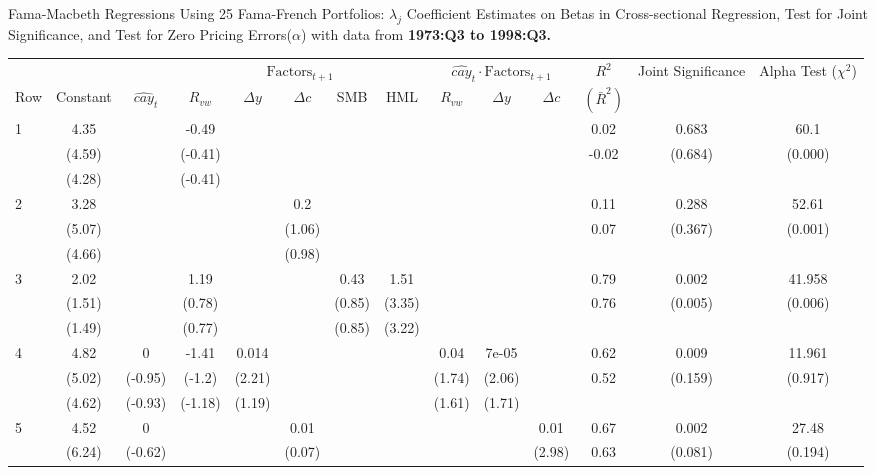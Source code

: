 \documentclass[12pt]{article}
\begin{document}
\begin{landscape}
\begin{threeparttable}[htbp]
\centering
\label{table:old}
\caption{  Fama-Macbeth Regressions Using 25 Fama-French Portfolios: $\lambda_j$ Coefficient Estimates on Betas in Cross-sectional Regression,  Test for Joint Significance, and Test for Zero Pricing Errors($\alpha$) with data from \textbf{1973:Q3 to 1998:Q3.} } 
\begin{tabular}{lccccccccccccc}
  \toprule
  \midrule
   & &  & \multicolumn{5}{c}{$\text{Factors}_{t+1}$}  & \multicolumn{3}{c}{$\widehat{cay}_t \cdot \text{Factors}_{t+1}$} & $R^2$ & \multirow{2}{2cm}{\centering Joint Significance} & \multirow{2}{2.5cm}{ \centering Alpha Test ($\chi^2$)} \\ \cmidrule(lr){4-8} \cmidrule(lr){9-11}
 Row & Constant & $\widehat{cay}_t$ & $R_{vw}$ & $\Delta y$ & $\Delta c$ & SMB & HML & $R_{vw}$  & $\Delta y$ & $\Delta c$ & $(\bar{R}^2)$ & & \\ \midrule
1 & 4.35 &  & -0.49 &  &  &  &  &  &  &  & 0.02 & 0.683 & 60.1 \\ 
   & (4.59) &  & (-0.41) &  &  &  &  &  &  &  & -0.02 & (0.684) & (0.000) \\ 
   & (4.28) &  & (-0.41) &  &  &  &  &  &  &  &  &  &  \\ 
  2 & 3.28 &  &  &  & 0.2 &  &  &  &  &  & 0.11 & 0.288 & 52.61 \\ 
   & (5.07) &  &  &  & (1.06) &  &  &  &  &  & 0.07 & (0.367) & (0.001) \\ 
   & (4.66) &  &  &  & (0.98) &  &  &  &  &  &  &  &  \\ 
  3 & 2.02 &  & 1.19 &  &  & 0.43 & 1.51 &  &  &  & 0.79 & 0.002 & 41.958 \\ 
   & (1.51) &  & (0.78) &  &  & (0.85) & (3.35) &  &  &  & 0.76 & (0.005) & (0.006) \\ 
   & (1.49) &  & (0.77) &  &  & (0.85) & (3.22) &  &  &  &  &  &  \\ 
  4 & 4.82 & 0 & -1.41 & 0.014 &  &  &  & 0.04 & 7e-05 &  & 0.62 & 0.009 & 11.961 \\ 
   & (5.02) & (-0.95) & (-1.2) & (2.21) &  &  &  & (1.74) & (2.06) &  & 0.52 & (0.159) & (0.917) \\ 
   & (4.62) & (-0.93) & (-1.18) & (1.19) &  &  &  & (1.61) & (1.71) &  &  &  &  \\ 
  5 & 4.52 & 0 &  &  & 0.01 &  &  &  &  & 0.01 & 0.67 & 0.002 & 27.48 \\ 
   & (6.24) & (-0.62) &  &  & (0.07) &  &  &  &  & (2.98) & 0.63 & (0.081) & (0.194) \\ 

\end{tabular}
\end{threeparttable}
\end{landscape}
\end{document}
